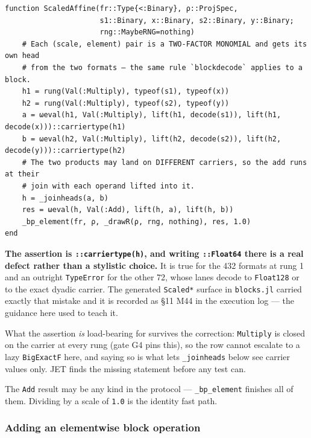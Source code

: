 \nopagebreak[4]
\begin{verbatim}
function ScaledAffine(fr::Type{<:Binary}, ρ::ProjSpec,
                      s1::Binary, x::Binary, s2::Binary, y::Binary;
                      rng::MaybeRNG=nothing)
    # Each (scale, element) pair is a TWO-FACTOR MONOMIAL and gets its own head
    # from the two formats — the same rule `blockdecode` applies to a block.
    h1 = rung(Val(:Multiply), typeof(s1), typeof(x))
    h2 = rung(Val(:Multiply), typeof(s2), typeof(y))
    a = ωeval(h1, Val(:Multiply), lift(h1, decode(s1)), lift(h1, decode(x)))::carriertype(h1)
    b = ωeval(h2, Val(:Multiply), lift(h2, decode(s2)), lift(h2, decode(y)))::carriertype(h2)
    # The two products may land on DIFFERENT carriers, so the add runs at their
    # join with each operand lifted into it.
    h = _joinheads(a, b)
    res = ωeval(h, Val(:Add), lift(h, a), lift(h, b))
    _bp_element(fr, ρ, _drawR(ρ, rng, nothing), res, 1.0)
end
\end{verbatim}



\textbf{The assertion is \texttt{::carriertype(h)}, and writing \texttt{::Float64} there is a real defect rather than a stylistic choice.} It is true for the 432 formats at rung 1 and an outright \texttt{TypeError} for the other 72, whose lanes decode to \texttt{Float128} or to the exact dyadic carrier. The generated \texttt{Scaled*} surface in \texttt{blocks.jl} carried exactly that mistake and it is recorded as §11 M44 in the execution log — the guidance here used to teach it.



What the assertion \emph{is} load-bearing for survives the correction: \texttt{Multiply} is closed on the carrier at every rung (gate G4 pins this), so the row cannot escalate to a lazy \texttt{BigExactF} here, and saying so is what lets \texttt{\_\allowbreak{}joinheads} below see carrier values only. JET finds the missing statement before any test can.



The \texttt{Add} result may be any kind in the protocol — \texttt{\_\allowbreak{}bp\_\allowbreak{}element} finishes all of them. Dividing by a scale of \texttt{1.0} is the identity fast path.



\subsubsection{Adding an elementwise block operation}



